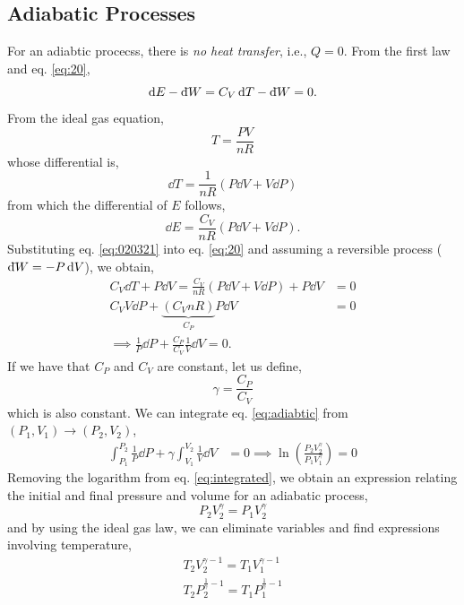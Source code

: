 \documentclass{book}
\newcommand{\dbar}{\mathrm{d}\hspace*{-0.08em}\bar{}\hspace*{0.1em}}
\begin{document}
\subsection{Adiabatic Processes}
For an adiabtic procecss, there is \textit{no heat transfer}, i.e., $Q = 0$. From the first law and eq. \eqref{eq:20},
\begin{equation}
	\dd{E} - \dbar{W} = C_V\dd{T} - \dbar{W} = 0. \label{eq:203}
\end{equation}
From the ideal gas equation,
\begin{equation}
	T = \frac{PV}{nR}
\end{equation}
whose differential is,
\begin{equation}
	\dd{T} = \frac{1}{nR}\left(P\dd{V} + V \dd{P}\right)
\end{equation}
from which the differential of $E$ follows,
\begin{equation}
	\dd{E} = \frac{C_V}{nR}\left(P\dd{V} + V \dd{P}\right).\label{eq:020321}
\end{equation}
Substituting eq. \eqref{eq:020321} into eq. \eqref{eq:20} and assuming a reversible process ($\dbar W = - P \dd{V}$), we obtain,
\begin{equation}
	\begin{split}
		C_V \dd{T} + P\dd{V} = \frac{C_V}{nR}(P\dd{V}+V\dd{P}) + P \dd{V} & = 0 \\
		C_VV\dd{P} + \underbrace{(C_V nR)}_{C_P}P\dd{V} & = 0 \\
		\implies \frac{1}{P}\dd{P} + \frac{C_P}{C_V}\frac{1}{V}\dd{V} = 0. \label{eq:adiabtic}
	\end{split}
\end{equation}
If we have that $C_P$ and $C_V$ are constant, let us define,
\begin{equation}
	\gamma = \frac{C_P}{C_V}
\end{equation}
which is also constant. We can integrate eq. \eqref{eq:adiabtic} from $(P_1,V_1) \to (P_2, V_2)$,
\begin{equation}
	\begin{split}
	\int_{P_1}^{P_2}\frac{1}{P}\dd{P} + \gamma \int_{V_1}^{V_2}\frac{1}{V}\dd{V} & = 0
	\implies \ln\left(\frac{P_2V_2^{\gamma}}{P_1V_1^{\gamma}}\right) = 0 \label{eq:integrated}
	\end{split}
\end{equation}
Removing the logarithm from eq. \eqref{eq:integrated}, we obtain an expression relating the initial and final pressure and volume for an adiabatic process,
\begin{equation}
	\boxed{P_2V_2^{\gamma} = P_1V_2^{\gamma}}
\end{equation}
and by using the ideal gas law, we can eliminate variables and find expressions involving temperature,
\begin{align}
	\boxed{T_2V_2^{\gamma -1} = T_1V_1^{\gamma -1}} \\
	\boxed{T_2P_2^{\frac{1}{\gamma} - 1} = T_1P_1^{\frac{1}{\gamma} - 1}}
\end{align}
\end{document}
